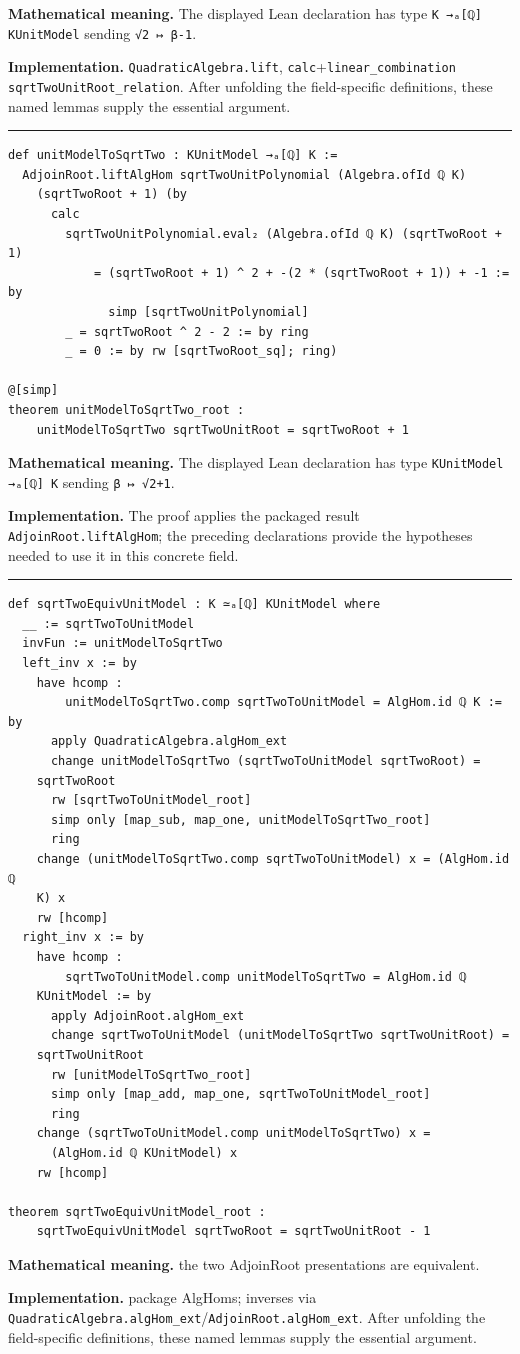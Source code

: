 \documentclass[UTF8,a4paper,11pt,fontset=fandol]{ctexart}
\theoremstyle{definition}
\newcommand{\statementsep}{\par\medskip\hrule\medskip}
\begin{document}
\noindent\textbf{Mathematical meaning.} The displayed Lean declaration has type \texttt{K →ₐ[ℚ] KUnitModel} sending \texttt{√2 ↦ β-1}.\par
\noindent\textbf{Implementation.} \texttt{QuadraticAlgebra.\allowbreak{}lift}, \texttt{calc}+\texttt{linear\_\allowbreak{}combination sqrtTwoUnitRoot\_\allowbreak{}relation}. After unfolding the field-specific definitions, these named lemmas supply the essential argument.\par
\statementsep
\begin{verbatim}
def unitModelToSqrtTwo : KUnitModel →ₐ[ℚ] K :=
  AdjoinRoot.liftAlgHom sqrtTwoUnitPolynomial (Algebra.ofId ℚ K)
    (sqrtTwoRoot + 1) (by
      calc
        sqrtTwoUnitPolynomial.eval₂ (Algebra.ofId ℚ K) (sqrtTwoRoot + 1)
            = (sqrtTwoRoot + 1) ^ 2 + -(2 * (sqrtTwoRoot + 1)) + -1 := by
              simp [sqrtTwoUnitPolynomial]
        _ = sqrtTwoRoot ^ 2 - 2 := by ring
        _ = 0 := by rw [sqrtTwoRoot_sq]; ring)

@[simp]
theorem unitModelToSqrtTwo_root :
    unitModelToSqrtTwo sqrtTwoUnitRoot = sqrtTwoRoot + 1
\end{verbatim}
\noindent\textbf{Mathematical meaning.} The displayed Lean declaration has type \texttt{KUnitModel →ₐ[ℚ] K} sending \texttt{β ↦ √2+1}.\par
\noindent\textbf{Implementation.} The proof applies the packaged result \texttt{AdjoinRoot.\allowbreak{}liftAlgHom}; the preceding declarations provide the hypotheses needed to use it in this concrete field.\par
\statementsep
\begin{verbatim}
def sqrtTwoEquivUnitModel : K ≃ₐ[ℚ] KUnitModel where
  __ := sqrtTwoToUnitModel
  invFun := unitModelToSqrtTwo
  left_inv x := by
    have hcomp :
        unitModelToSqrtTwo.comp sqrtTwoToUnitModel = AlgHom.id ℚ K := by
      apply QuadraticAlgebra.algHom_ext
      change unitModelToSqrtTwo (sqrtTwoToUnitModel sqrtTwoRoot) =
    sqrtTwoRoot
      rw [sqrtTwoToUnitModel_root]
      simp only [map_sub, map_one, unitModelToSqrtTwo_root]
      ring
    change (unitModelToSqrtTwo.comp sqrtTwoToUnitModel) x = (AlgHom.id ℚ
    K) x
    rw [hcomp]
  right_inv x := by
    have hcomp :
        sqrtTwoToUnitModel.comp unitModelToSqrtTwo = AlgHom.id ℚ
    KUnitModel := by
      apply AdjoinRoot.algHom_ext
      change sqrtTwoToUnitModel (unitModelToSqrtTwo sqrtTwoUnitRoot) =
    sqrtTwoUnitRoot
      rw [unitModelToSqrtTwo_root]
      simp only [map_add, map_one, sqrtTwoToUnitModel_root]
      ring
    change (sqrtTwoToUnitModel.comp unitModelToSqrtTwo) x =
      (AlgHom.id ℚ KUnitModel) x
    rw [hcomp]

theorem sqrtTwoEquivUnitModel_root :
    sqrtTwoEquivUnitModel sqrtTwoRoot = sqrtTwoUnitRoot - 1
\end{verbatim}
\noindent\textbf{Mathematical meaning.} the two AdjoinRoot presentations are equivalent.\par
\noindent\textbf{Implementation.} package AlgHoms; inverses via \texttt{QuadraticAlgebra.\allowbreak{}algHom\_\allowbreak{}ext}/\texttt{AdjoinRoot.\allowbreak{}algHom\_\allowbreak{}ext}. After unfolding the field-specific definitions, these named lemmas supply the essential argument.\par
\end{document}
